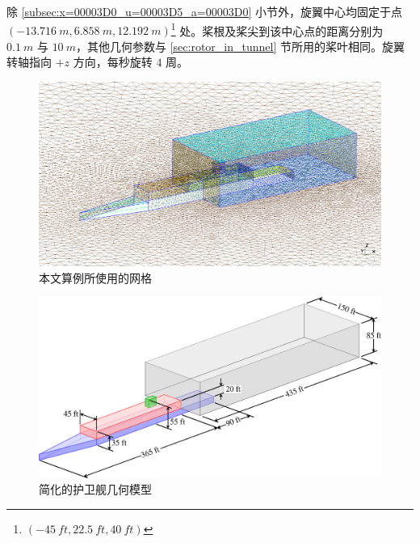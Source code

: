 除 \ref{subsec:x=00003D0_u=00003D5_a=00003D0} 小节外，旋翼中心均固定于点 $(\SI{-13.716}{m},\SI{6.858}{m},\SI{12.192}{m})$\footnote{$(\SI{-45}{ft},\SI{22.5}{ft},\SI{40}{ft})$}
处。桨根及桨尖到该中心点的距离分别为 $\SI{0.1}{m}$ 与 $\SI{10}{m}$，其他几何参数与 \ref{sec:rotor_in_tunnel}
节所用的桨叶相同。旋翼转轴指向 $+z$ 方向，每秒旋转 $4$ 周。

\begin{figure}[h!]
\begin{centering}
\includegraphics[width=1\textwidth,height=0.4\textheight,keepaspectratio]{figures/ship/grid}
\par\end{centering}
\caption{\label{fig:ship_mesh}本文算例所使用的网格}
\end{figure}

\begin{figure}[h!]
\begin{centering}
\includegraphics[width=1\textwidth,height=0.4\textheight,keepaspectratio]{figures/ship/simple_frigate.jpeg}
\par\end{centering}
\caption{\label{fig:ship_geometry}简化的护卫舰几何模型}
\end{figure}


